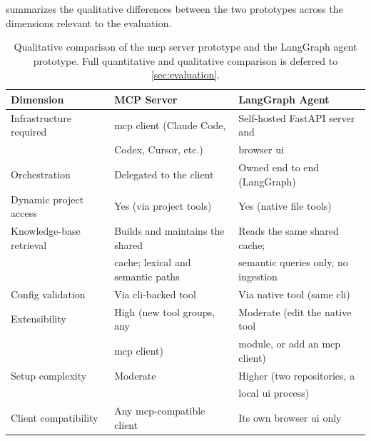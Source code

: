 \documentclass[
  numbers=noenddot,
  english,
  a4paper,
  twoside,
  bibliography=totoc,
  headsepline,
  cleardoublepage=empty,
  parskip=half,
  draft=false
]{scrbook}
\theoremstyle{break}
\renewcommand{\_}{\textunderscore\allowbreak}
\begin{document}
 summarizes the qualitative differences between the two
prototypes across the dimensions relevant to the evaluation.

\begin{table}[htbp]
  \caption{Qualitative comparison of the \gls{mcp} server prototype and the LangGraph agent
           prototype. Full quantitative and qualitative comparison is deferred to \cref{sec:evaluation}.}
  \label{tab:approach-comparison}
  \centering
  \begin{tabular}{lll}
    \toprule
    \textbf{Dimension}       & \textbf{MCP Server}              & \textbf{LangGraph Agent}          \\
    \midrule
    Infrastructure required  & \gls{mcp} client (Claude Code,   & Self-hosted FastAPI server and    \\
                              & Codex, Cursor, etc.)             & browser \gls{ui}                  \\
    Orchestration             & Delegated to the client          & Owned end to end (LangGraph)      \\
    Dynamic project access   & Yes (via project tools)          & Yes (native file tools)           \\
    Knowledge-base retrieval & Builds and maintains the shared  & Reads the same shared cache;      \\
                              & cache; lexical and semantic paths & semantic queries only, no ingestion \\
    Config validation        & Via \gls{cli}-backed tool        & Via native tool (same \gls{cli})  \\
    Extensibility            & High (new tool groups, any       & Moderate (edit the native tool    \\
                              & \gls{mcp} client)                 & module, or add an \gls{mcp} client) \\
    Setup complexity          & Moderate                         & Higher (two repositories, a       \\
                              &                                   & local \gls{ui} process)            \\
    Client compatibility     & Any \gls{mcp}-compatible client   & Its own browser \gls{ui} only     \\
    \bottomrule
  \end{tabular}
\end{table}
\end{document}
